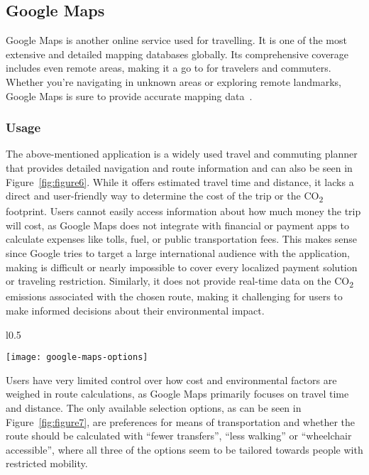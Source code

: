 \subsection{Google Maps}\label{subsec:google-maps}

Google Maps is another online service used for travelling.
It is one of the most extensive and detailed mapping databases globally.
Its comprehensive coverage includes even remote areas, making it a go to for travelers and commuters.
Whether you're navigating in unknown areas or exploring remote landmarks, Google Maps is sure to provide accurate
mapping data~\cite{googlemaps2023}.

\subsubsection{Usage}

The above-mentioned application is a widely used travel and commuting planner that provides detailed navigation and
route information and can also be seen in Figure~\ref{fig:figure6}.
While it offers estimated travel time and distance, it lacks a direct and user-friendly way to determine the cost of the
trip or the \unit{CO_{2}} footprint.
Users cannot easily access information about how much money the trip will cost, as Google Maps does not integrate with
financial or payment apps to calculate expenses like tolls, fuel, or public transportation fees.
This makes sense since Google tries to target a large international audience with the application, making is difficult
or nearly impossible to cover every localized payment solution or traveling restriction.
Similarly, it does not provide real-time data on the \unit{CO_{2}} emissions associated with the chosen route, making it
challenging for users to make informed decisions about their environmental impact.

\begin{wrapfigure}{l}{0.5\textwidth}
    \begin{center}
        \texttt{[image: google-maps-options]}
    \end{center}
    \caption{Google Maps web UI options.}
    \label{fig:figure7}
\end{wrapfigure}

Users have very limited control over how cost and environmental factors are weighed in route calculations, as Google
Maps primarily focuses on travel time and distance.
The only available selection options, as can be seen in Figure~\ref{fig:figure7}, are preferences for means of
transportation and whether the route should be calculated with ``fewer transfers'', ``less walking'' or ``wheelchair
accessible'', where all three of the options seem to be tailored towards people with restricted mobility.


